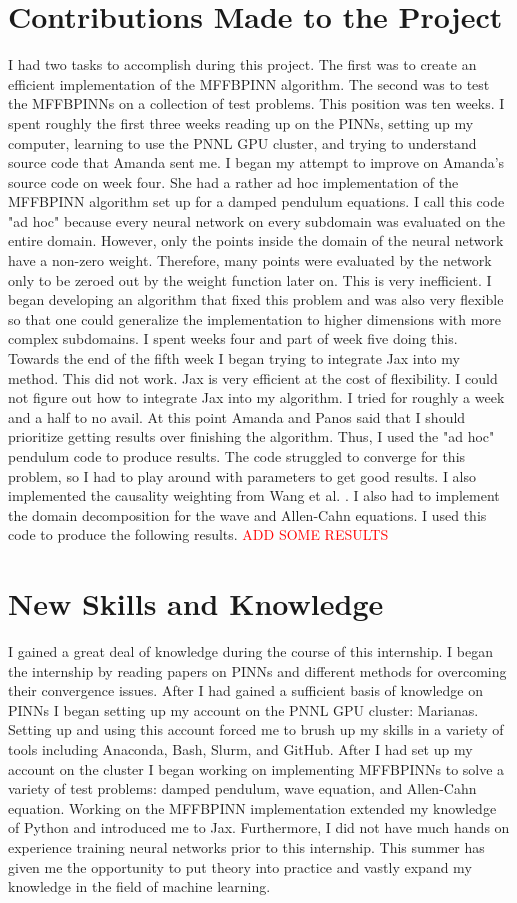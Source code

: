 \documentclass[12pt]{article}
\begin{document}
\section{Contributions Made to the Project}
I had two tasks to accomplish during this project. The first was to create an efficient implementation of the MFFBPINN algorithm. The second was to test the MFFBPINNs on a collection of test problems. This position was ten weeks. I spent roughly the first three weeks reading up on the PINNs, setting up my computer, learning to use the PNNL GPU cluster, and trying to understand source code that Amanda sent me. I began my attempt to improve on Amanda's source code on week four. She had a rather ad hoc implementation of the MFFBPINN algorithm set up for a damped pendulum equations. I call this code "ad hoc" because every neural network on every subdomain was evaluated on the entire domain. However, only the points inside the domain of the neural network have a non-zero weight. Therefore, many points were evaluated by the network only to be zeroed out by the weight function later on. This is very inefficient. I began developing an algorithm that fixed this problem and was also very flexible so that one could generalize the implementation to higher dimensions with more complex subdomains. I spent weeks four and part of week five doing this. Towards the end of the fifth week I began trying to integrate Jax into my method. This did not work. Jax is very efficient at the cost of flexibility. I could not figure out how to integrate Jax into my algorithm. I tried for roughly a week and a half to no avail. At this point Amanda and Panos said that I should prioritize getting results over finishing the algorithm. Thus, I used the "ad hoc" pendulum code to produce results. The code struggled to converge for this problem, so I had to play around with parameters to get good results. I also implemented the causality weighting from Wang et al. \cite{causality}. I also had to implement the domain decomposition for the wave and Allen-Cahn equations. I used this code to produce the following results. \textcolor{red}{ADD SOME RESULTS}

\section{New Skills and Knowledge}
I gained a great deal of knowledge during the course of this internship. I began the internship by reading papers on PINNs and different methods for overcoming their convergence issues. After I had gained a sufficient basis of knowledge on PINNs I began setting up my account on the PNNL GPU cluster: Marianas. Setting up and using this account forced me to brush up my skills in a variety of tools including Anaconda, Bash, Slurm, and GitHub. After I had set up my account on the cluster I began working on implementing  MFFBPINNs to solve a variety of test problems: damped pendulum, wave equation, and Allen-Cahn equation. Working on the MFFBPINN implementation extended my knowledge of Python and introduced me to Jax. Furthermore, I did not have much hands on experience training neural networks prior to this internship. This summer has given me the opportunity to put theory into practice and vastly expand my knowledge in the field of machine learning.
\end{document}
